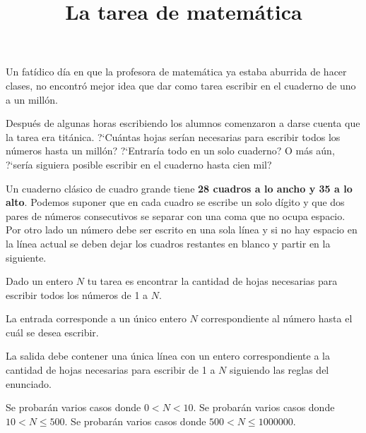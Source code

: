 \documentclass{oci}
\title{La tarea de matemática}
\begin{document}
\begin{problemDescription}
  Un fatídico día en que la profesora de matemática ya estaba aburrida de
  hacer clases, no encontró mejor idea que dar como tarea escribir en el
  cuaderno de uno a un millón.

  Después de algunas horas escribiendo los alumnos comenzaron a darse cuenta que
  la tarea era titánica.
  ?`Cuántas hojas serían necesarias para escribir todos los números hasta un
  millón?
  ?`Entraría todo en un solo cuaderno?
  O más aún, ?`sería siguiera posible escribir en el cuaderno hasta cien mil?

  Un cuaderno clásico de cuadro grande tiene \textbf{28 cuadros a lo ancho y 35
    a lo alto}.
  Podemos suponer que en cada cuadro se escribe un solo dígito y que dos pares
  de números consecutivos se separar con una coma que no ocupa espacio.
  Por otro lado un número debe ser escrito en una sola línea y si no hay espacio
  en la línea actual se deben dejar los cuadros restantes en blanco y partir en
  la siguiente.

  Dado un entero $N$ tu tarea es encontrar la cantidad de hojas necesarias para
  escribir todos los números de 1 a $N$.
\end{problemDescription}

\begin{inputDescription}
  La entrada corresponde a un único entero $N$ correspondiente al número hasta
  el cuál se desea escribir.
\end{inputDescription}

\begin{outputDescription}
  La salida debe contener una única línea con un entero correspondiente a la
  cantidad de hojas necesarias para escribir de 1 a $N$ siguiendo las reglas del
  enunciado.
\end{outputDescription}

\begin{scoreDescription}
   Se probarán varios casos donde $0 < N < 10$.
   Se probarán varios casos donde $10 < N \leq 500$.
   Se probarán varios casos donde $500 < N \leq 1000000$.
\end{scoreDescription}

\begin{sampleDescription}
\end{sampleDescription}
\end{document}
